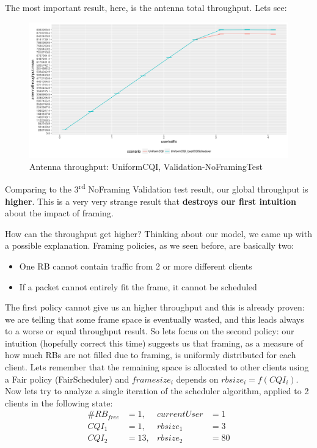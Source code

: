 The most important result, here, is the antenna total throughput. Lets see:
\begin{figure}[H]
  \includegraphics[width=1\textwidth]{images/thantenna-1}
  \caption{Antenna throughput: UniformCQI, Validation-NoFramingTest}
  \label{fig:Antenna throughput: UniformCQI, Validation-NoFramingTest}
\end{figure}

Comparing to the 3\textsuperscript{rd} NoFraming Validation test result, our global throughput is \textbf{higher}. This is a very very strange result that \textbf{destroys our first intuition} about the impact of framing.

How can the throughput get higher? Thinking about our model, we came up with a possible explanation. Framing policies, as we seen before, are basically two:
\begin{itemize}
	\item One RB cannot contain traffic from 2 or more different clients
	\item If a packet cannot entirely fit the frame, it cannot be scheduled
\end{itemize}
The first policy cannot give us an higher throughput and this is already proven: we are telling that some frame space is eventually wasted, and this leads always to a worse or equal throughput result. So lets focus on the second policy: our intuition (hopefully correct this time) suggests us that framing, as a measure of how much RBs are not filled due to framing, is uniformly distributed for each client. Lets remember that the remaining space is allocated to other clients using a Fair policy (FairScheduler) and \(framesize_i\) depends on \(rbsize_i = f(CQI_i)\). Now lets try to analyze a single iteration of the scheduler algorithm, applied to 2 clients in the following state:
\begin{align}
 \#RB_{free} &= 1, &currentUser &= 1 \nonumber \\
 	   CQI_1 &= 1, &rbsize_1 &= 3 \nonumber \\
	   CQI_2 &= 13, &rbsize_2 &= 80 \nonumber
\end{align}


